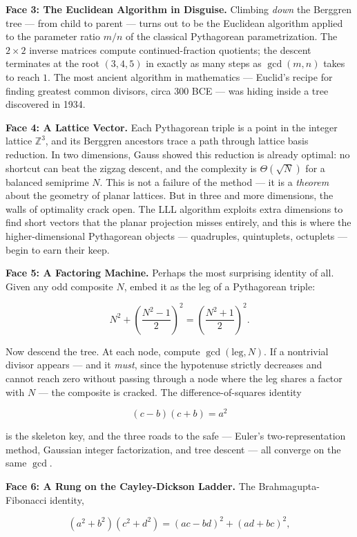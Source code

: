 \textbf{Face 3: The Euclidean Algorithm in Disguise.} Climbing \textit{down} the Berggren tree --- from child to parent --- turns out to be the Euclidean algorithm applied to the parameter ratio $m/n$ of the classical Pythagorean parametrization. The $2 \times 2$ inverse matrices compute continued-fraction quotients; the descent terminates at the root $(3, 4, 5)$ in exactly as many steps as $\gcd(m, n)$ takes to reach $1$. The most ancient algorithm in mathematics --- Euclid's recipe for finding greatest common divisors, circa 300 BCE --- was hiding inside a tree discovered in 1934.

\textbf{Face 4: A Lattice Vector.} Each Pythagorean triple is a point in the integer lattice $\mathbb{Z}^3$, and its Berggren ancestors trace a path through lattice basis reduction. In two dimensions, Gauss showed this reduction is already optimal: no shortcut can beat the zigzag descent, and the complexity is $\Theta(\sqrt{N})$ for a balanced semiprime $N$. This is not a failure of the method --- it is a \textit{theorem} about the geometry of planar lattices. But in three and more dimensions, the walls of optimality crack open. The LLL algorithm exploits extra dimensions to find short vectors that the planar projection misses entirely, and this is where the higher-dimensional Pythagorean objects --- quadruples, quintuplets, octuplets --- begin to earn their keep.

\textbf{Face 5: A Factoring Machine.} Perhaps the most surprising identity of all. Given any odd composite $N$, embed it as the leg of a Pythagorean triple:

\[
N^2 + \left(\frac{N^2 - 1}{2}\right)^{\!2} = \left(\frac{N^2 + 1}{2}\right)^{\!2}.
\]

Now descend the tree. At each node, compute $\gcd(\text{leg}, N)$. If a nontrivial divisor appears --- and it \textit{must}, since the hypotenuse strictly decreases and cannot reach zero without passing through a node where the leg shares a factor with $N$ --- the composite is cracked. The difference-of-squares identity

\[
(c - b)(c + b) = a^2
\]

is the skeleton key, and the three roads to the safe --- Euler's two-representation method, Gaussian integer factorization, and tree descent --- all converge on the same $\gcd$.

\textbf{Face 6: A Rung on the Cayley-Dickson Ladder.} The Brahmagupta-Fibonacci identity,

\[
(a^2 + b^2)(c^2 + d^2) = (ac - bd)^2 + (ad + bc)^2,
\]

